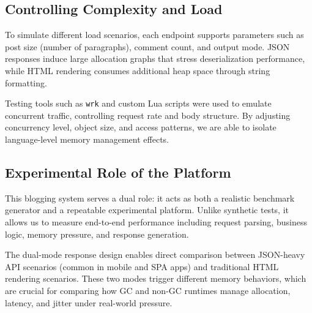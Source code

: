\subsection{Controlling Complexity and Load}

To simulate different load scenarios, each endpoint supports parameters such as post size (number of paragraphs), comment count, and output mode. JSON responses induce large allocation graphs that stress deserialization performance, while HTML rendering consumes additional heap space through string formatting.

Testing tools such as \texttt{wrk} and custom Lua scripts were used to emulate concurrent traffic, controlling request rate and body structure. By adjusting concurrency level, object size, and access patterns, we are able to isolate language-level memory management effects.

\subsection{Experimental Role of the Platform}

This blogging system serves a dual role: it acts as both a realistic benchmark generator and a repeatable experimental platform. Unlike synthetic tests, it allows us to measure end-to-end performance including request parsing, business logic, memory pressure, and response generation.

The dual-mode response design enables direct comparison between JSON-heavy API scenarios (common in mobile and SPA apps) and traditional HTML rendering scenarios. These two modes trigger different memory behaviors, which are crucial for comparing how GC and non-GC runtimes manage allocation, latency, and jitter under real-world pressure.

